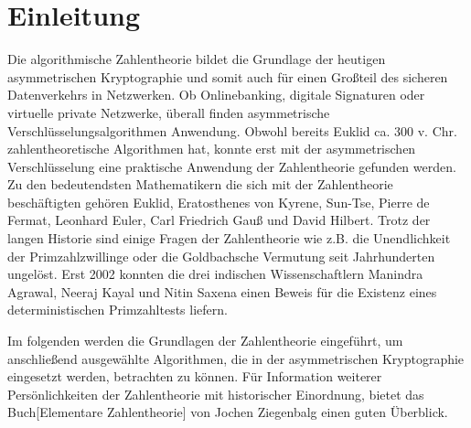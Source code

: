 \section{Einleitung}
	Die algorithmische Zahlentheorie bildet die Grundlage der heutigen asymmetrischen Kryptographie und somit auch für einen Großteil des sicheren Datenverkehrs in Netzwerken. Ob Onlinebanking, digitale Signaturen oder virtuelle private Netzwerke, überall finden asymmetrische Verschlüsselungsalgorithmen Anwendung. Obwohl bereits Euklid ca. 300 v. Chr. zahlentheoretische Algorithmen hat, konnte erst mit der asymmetrischen Verschlüsselung eine praktische Anwendung der Zahlentheorie gefunden werden. Zu den bedeutendsten Mathematikern die sich mit der Zahlentheorie beschäftigten gehören Euklid, Eratosthenes von Kyrene, Sun-Tse, Pierre de Fermat, Leonhard Euler, Carl Friedrich Gauß und David Hilbert. Trotz der langen Historie sind einige Fragen der Zahlentheorie wie z.B. die Unendlichkeit der Primzahlzwillinge oder die Goldbachsche Vermutung seit Jahrhunderten ungelöst. Erst 2002 konnten die drei indischen Wissenschaftlern Manindra Agrawal, Neeraj Kayal und Nitin Saxena einen Beweis für die Existenz eines deterministischen Primzahltests liefern.
	
	Im folgenden werden die Grundlagen der Zahlentheorie eingeführt, um anschließend ausgewählte Algorithmen, die in der asymmetrischen Kryptographie eingesetzt werden, betrachten zu können. Für Information weiterer Persönlichkeiten der Zahlentheorie mit historischer Einordnung, bietet das Buch[Elementare Zahlentheorie] von Jochen Ziegenbalg einen guten Überblick.
	
	 